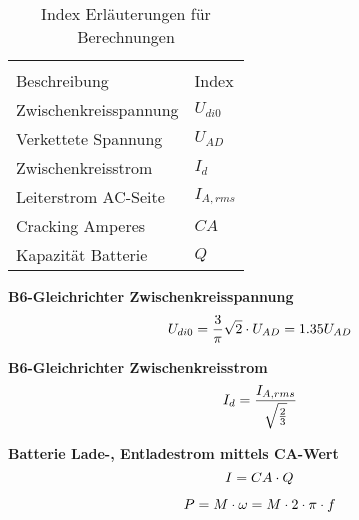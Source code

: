 \begin{table}[H]
	\centering
	\begin{tabular}{C{5cm} C{2.5cm}}
		\\
		{Beschreibung} & {Index} \\ \hline
		Zwischenkreisspannung    &   $  U_{di0} $   \\
		Verkettete Spannung    &   $ U_{AD} $   \\
		Zwischenkreisstrom    &   $ I_{d} $  \\
		Leiterstrom AC-Seite    &  $ I_{A,rms} $   \\
		Cracking Amperes    &  $ CA $  \\
		Kapazität Batterie    &  $ Q $   \\
	\end{tabular}
	\caption{Index Erläuterungen für Berechnungen}
	\label{tab:Begriffserklaerung}
\end{table}



\textbf{B6-Gleichrichter Zwischenkreisspannung}
\begin{equation}
	\centering
	U_{di0}=\frac{3}{\pi}\sqrt{2}\cdot U_{AD}=1.35U_{AD}
	\label{eq:B6-Ud}
\end{equation}

\textbf{B6-Gleichrichter Zwischenkreisstrom}
\begin{equation}
	\centering
	I_{d}=\frac{I_{A,rms}}{\sqrt{\frac{2}{3}}}
	\label{eq:B6-Id}
\end{equation}

\textbf{Batterie Lade-, Entladestrom mittels CA-Wert}
\begin{equation}
	\centering
	I=CA \cdot Q
	\label{eq:CA}
\end{equation}

\begin{equation}
\centering
P = M \cdot \omega = M \cdot 2 \cdot \pi\cdot f
\label{eq:Leistung}
\end{equation}